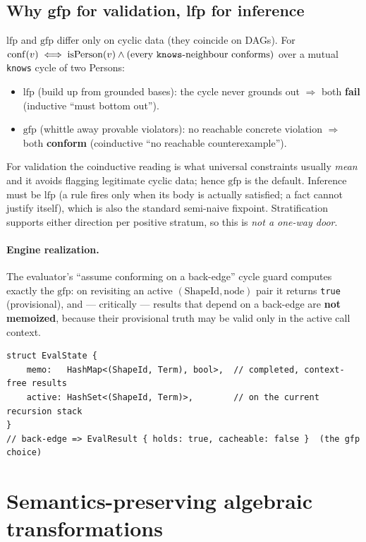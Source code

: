 \documentclass[11pt]{article}
\newcommand{\lfp}{\mathrm{lfp}}
\newcommand{\gfp}{\mathrm{gfp}}
\newcommand{\code}[1]{\texttt{#1}}
\theoremstyle{definition}
\begin{document}
\subsection{Why gfp for validation, lfp for inference}
$\lfp$ and $\gfp$ differ only on cyclic data (they coincide on DAGs). For
$\mathrm{conf}(v)\iff \mathrm{isPerson}(v)\wedge(\text{every \code{knows}-neighbour conforms})$
over a mutual \code{knows} cycle of two Persons:
\begin{itemize}[leftmargin=1.4em]
  \item $\lfp$ (build up from grounded bases): the cycle never grounds out
  $\Rightarrow$ both \textbf{fail} (inductive ``must bottom out'').
  \item $\gfp$ (whittle away provable violators): no reachable concrete violation
  $\Rightarrow$ both \textbf{conform} (coinductive ``no reachable
  counterexample'').
\end{itemize}
For validation the coinductive reading is what universal constraints usually
\emph{mean} and it avoids flagging legitimate cyclic data; hence $\gfp$ is the
default. Inference must be $\lfp$ (a rule fires only when its body is actually
satisfied; a fact cannot justify itself), which is also the standard semi-naive
fixpoint. Stratification supports either direction per positive stratum, so this
is \emph{not a one-way door}.

\paragraph{Engine realization.} The evaluator's ``assume conforming on a
back-edge'' cycle guard computes exactly the $\gfp$: on revisiting an active
$(\text{ShapeId},\text{node})$ pair it returns \code{true} (provisional), and ---
critically --- results that depend on a back-edge are \textbf{not memoized},
because their provisional truth may be valid only in the active call context.
\begin{lstlisting}
struct EvalState {
    memo:   HashMap<(ShapeId, Term), bool>,  // completed, context-free results
    active: HashSet<(ShapeId, Term)>,        // on the current recursion stack
}
// back-edge => EvalResult { holds: true, cacheable: false }  (the gfp choice)
\end{lstlisting}

\section{Semantics-preserving algebraic transformations}\label{sec:norm}
\end{document}
